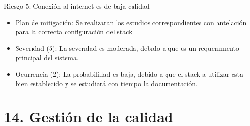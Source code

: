 \documentclass[
11pt, %
]{charter}
\begin{document}
Riesgo 5: Conexión al internet es de baja calidad
\begin{itemize}
	\item Plan de mitigación: Se realizaran los estudios correspondientes con antelación para la correcta configuración del stack.
	\item Severidad (5): La severidad es moderada, debido a que es un requerimiento principal del sistema.
	\item Ocurrencia (2): La probabilidad es baja, debido a que el stack a utilizar esta bien establecido y se estudiará con tiempo la documentación.
\end{itemize}



\section{14. Gestión de la calidad}
\label{sec:calidad}
\end{document}
